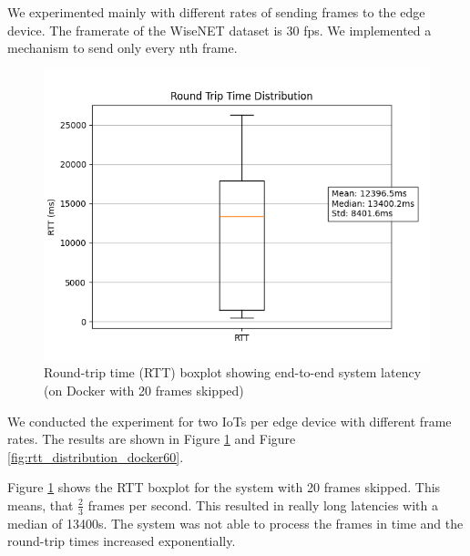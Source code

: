 \documentclass[conference]{IEEEtran}
\begin{document}
We experimented mainly with different rates of sending frames to the edge device. The framerate of the WiseNET dataset is 30 fps. We implemented a mechanism to send only every nth frame.


\begin{figure}[!htbp]
    \centering
    \includegraphics[width=1\linewidth]{./res/rtt_distribution-local_docker_test20skip.png}
    \caption{Round-trip time (RTT) boxplot showing end-to-end system latency (on Docker with 20 frames skipped)}
    \label{fig:rtt_distribution_docker20}
\end{figure}
We conducted the experiment for two IoTs per edge device with different frame rates. The results are shown in Figure \ref{fig:rtt_distribution_docker20} and Figure \ref{fig:rtt_distribution_docker60}.


Figure \ref{fig:rtt_distribution_docker20} shows the RTT boxplot for the system with 20 frames skipped. This means, that $\frac{2}{3}$ frames per second.
This resulted in really long latencies with a median of 13400s. The system was not able to process the frames in time and the round-trip times increased exponentially. 
\end{document}
